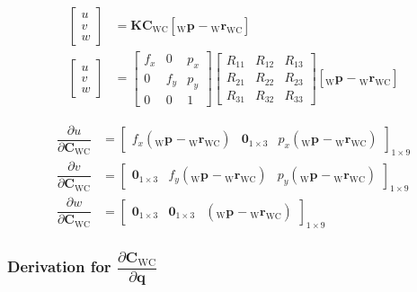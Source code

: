 \documentclass{report}
\renewcommand{\Vec}[1]{{\mathbf{#1}}}
\newcommand{\Mat}[1]{{\mathbf{#1}}}
\newcommand{\Zeros}[2]{{\Vec{0}_{#1\times#2}}}
\newcommand{\quat}{{\Vec{q}}}
\newcommand{\cam}{{\text{C}}}
\newcommand{\world}{{\text{W}}}
\newcommand{\KineNotationTransform}[3]{{{#1}_{#2#3}}}
\newcommand{\KineNotation}[3]{{{{}_{#2}} {#1}_{#2#3}}}
\newcommand{\KineNotationPart}[3]{{{{}_{#2}} {#1}_{#3}}}
\newcommand{\pos}{{\Vec{r}}}
\newcommand{\Pos}[2]{{\KineNotation{\pos}{#1}{#2}}}
\newcommand{\rot}{{\Mat{C}}}
\newcommand{\Rot}[2]{{\KineNotationTransform{\rot}{#1}{#2}}}
\newcommand{\point}{\Vec{p}}
\newcommand{\Pt}[1]{{\KineNotationPart{\point}{#1}{}}}
\newcommand{\camRot}{{\Rot{\world}{\cam}}}
\newcommand{\camPos}{{\Pos{\world}{\cam}}}
\begin{document}
\begin{align}
  \begin{bmatrix} u \\ v \\ w \end{bmatrix}
    &= \Mat{K} \camRot [\Pt{\world} - \camPos]
    \nonumber \\
  \begin{bmatrix} u \\ v \\ w \end{bmatrix}
  &= \begin{bmatrix}
      f_x & 0 & p_x \\
      0 & f_y & p_y \\
      0 & 0 & 1
  \end{bmatrix}
  \begin{bmatrix}
      R_{11} & R_{12} & R_{13} \\
      R_{21} & R_{22} & R_{23} \\
      R_{31} & R_{32} & R_{33}
  \end{bmatrix}
  [\Pt{\world} - \camPos]
  \nonumber
\end{align}

\begin{align}
  \dfrac{\partial{u}}{\partial{\camRot}} &=
      \begin{bmatrix}
        f_{x} (\Pt{\world} - \camPos) &
        \Zeros{1}{3} &
        p_{x} (\Pt{\world} - \camPos)
      \end{bmatrix}_{1 \times 9} \\
  \dfrac{\partial{v}}{\partial{\camRot}} &=
    \begin{bmatrix}
      \Zeros{1}{3} &
      f_{y} (\Pt{\world} - \camPos) &
      p_{y} (\Pt{\world} - \camPos)
  \end{bmatrix}_{1 \times 9} \\
  \dfrac{\partial{w}}{\partial{\camRot}} &=
    \begin{bmatrix}
      \Zeros{1}{3} &
      \Zeros{1}{3} &
      (\Pt{\world} - \camPos)
    \end{bmatrix}_{1 \times 9}
\end{align}


\subsubsection*{Derivation for \color{cyan}
$\dfrac{\partial{\camRot}}{\partial{\quat}}$}
\end{document}
